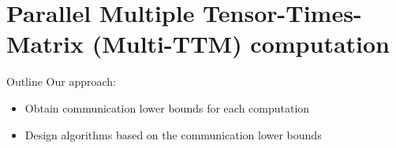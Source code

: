 \documentclass[aspectratio=169]{beamer}
\begin{document}
\begin{frame}
	\titlepage %
\end{frame}



%
	\section{Parallel Multiple Tensor-Times-Matrix (Multi-TTM) computation}
\begin{frame}{Outline}
		\tableofcontents[hideallsubsections]
		\vfill
		\vfill
		Our approach:
		\begin{itemize}
			\item Obtain communication lower bounds for each computation
			\item Design algorithms based on the communication lower bounds
		\end{itemize}
\end{frame}
\end{document}

